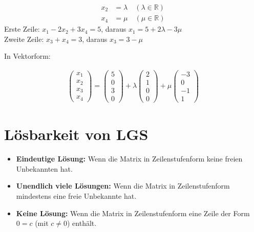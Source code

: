 \documentclass{article}
\begin{document}
\begin{minipage}[t]{0.45\textwidth}
    \begin{align*}
        x_2 &= \lambda \quad (\lambda \in \mathbb{R}) \\
        x_4 &= \mu \quad (\mu \in \mathbb{R})
    \end{align*}
    Erste Zeile: \( x_1 - 2x_2 + 3x_4 = 5 \), daraus \( x_1 = 5 + 2\lambda - 3\mu \)\\
    Zweite Zeile: \( x_3 + x_4 = 3 \), daraus \( x_3 = 3 - \mu \)
\end{minipage}
\hfill
\begin{minipage}[t]{0.45\textwidth}
    In Vektorform:

    \begin{align*}
        \begin{pmatrix}
        x_1 \\
        x_2 \\
        x_3 \\
        x_4
        \end{pmatrix}
        = 
        \begin{pmatrix}
        5 \\
        0 \\
        3 \\
        0
        \end{pmatrix}
        + \lambda
        \begin{pmatrix}
        2 \\
        1 \\
        0 \\
        0
        \end{pmatrix}
        + \mu
        \begin{pmatrix}
            -3 \\
            0 \\
            -1 \\
            1
        \end{pmatrix}
    \end{align*}
\end{minipage}

\section*{Lösbarkeit von LGS}
\begin{itemize}
    \item \textbf{Eindeutige Lösung:} Wenn die Matrix in Zeilenstufenform keine freien Unbekannten hat.
    \item \textbf{Unendlich viele Lösungen:} Wenn die Matrix in Zeilenstufenform mindestens eine freie Unbekannte hat.
    \item \textbf{Keine Lösung:} Wenn die Matrix in Zeilenstufenform eine Zeile der Form \(0 = c\) (mit \(c \neq 0\)) enthält.
\end{itemize}
\end{document}
